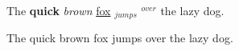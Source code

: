 \documentclass[12pt]{article}
\begin{document}
\noindent
The \textbf{quick} \textit{brown} \underline{fox} $_{jumps}$ $^{over}$ the lazy dog. 
\par \noindent
{\tiny The} {\scriptsize quick} {\normalsize brown} {\large fox} {\LARGE jumps} {\huge over} the lazy dog.
\par \noindent
\tiny
\blindtext \\
\Large
\blindtext \\
\normalsize
\blindtext
\end{document}
